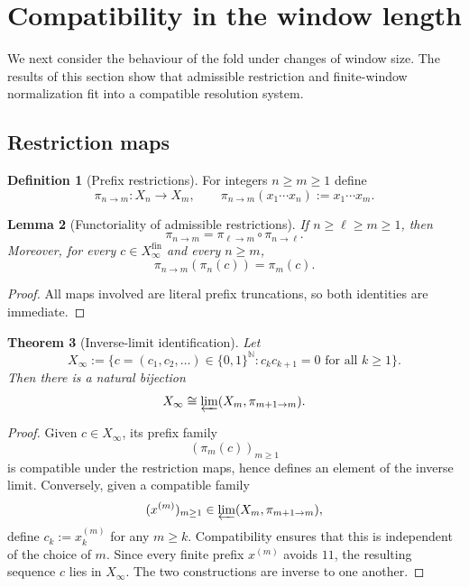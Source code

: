 \documentclass[11pt,letterpaper]{article}
\numberwithin{equation}{section}
\theoremstyle{plain}
\newtheorem{theorem}{Theorem}[section]
\newtheorem{lemma}[theorem]{Lemma}
\theoremstyle{definition}
\newtheorem{definition}[theorem]{Definition}
\theoremstyle{remark}
\newcommand{\NN}{\mathbb{N}}
\newcommand{\Xfin}{X_\infty^{\mathrm{fin}}}
\newcommand{\Xinf}{X_\infty}
\begin{document}
\section{Compatibility in the window length}

We next consider the behaviour of the fold under changes of window size.  The
results of this section show that admissible restriction and finite-window
normalization fit into a compatible resolution system.

\subsection{Restriction maps}

\begin{definition}[Prefix restrictions]
\label{def:prefix-restriction}
For integers $n\ge m\ge 1$ define
\[
\pi_{n\to m}:X_n\to X_m,
\qquad
\pi_{n\to m}(x_1\cdots x_n):=x_1\cdots x_m.
\]
\end{definition}

\begin{lemma}[Functoriality of admissible restrictions]
\label{lem:pi-functorial}
If $n\ge \ell\ge m\ge 1$, then
\[
\pi_{n\to m}=\pi_{\ell\to m}\circ \pi_{n\to \ell}.
\]
Moreover, for every $c\in \Xfin$ and every $n\ge m$,
\[
\pi_{n\to m}(\pi_n(c))=\pi_m(c).
\]
\end{lemma}

\begin{proof}
All maps involved are literal prefix truncations, so both identities are
immediate.
\end{proof}

\begin{theorem}[Inverse-limit identification]
\label{thm:inverse-limit-golden}
Let
\[
\Xinf
:=
\{c=(c_1,c_2,\ldots)\in\{0,1\}^{\NN}:c_kc_{k+1}=0\text{ for all }k\ge 1\}.
\]
Then there is a natural bijection
\[
\Xinf\cong \varprojlim (X_m,\pi_{m+1\to m}).
\]
\end{theorem}

\begin{proof}
Given $c\in \Xinf$, its prefix family
\[
(\pi_m(c))_{m\ge 1}
\]
is compatible under the restriction maps, hence defines an element of the
inverse limit.  Conversely, given a compatible family
\[
(x^{(m)})_{m\ge 1}\in \varprojlim (X_m,\pi_{m+1\to m}),
\]
define $c_k:=x_k^{(m)}$ for any $m\ge k$.  Compatibility ensures that this is
independent of the choice of $m$.  Since every finite prefix $x^{(m)}$ avoids
$11$, the resulting sequence $c$ lies in $\Xinf$.  The two constructions are
inverse to one another.
\end{proof}
\end{document}
